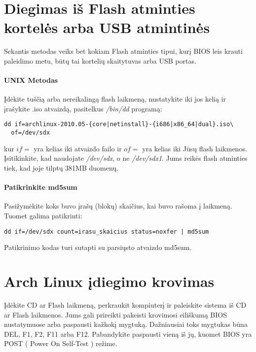   \section{Diegimas iš Flash atminties kortelės arba USB atmintinės}

  Sekantis metodas veiks bet kokiam Flash atminties tipui, kurį BIOS
  leis krauti paleidimo metu, būtų tai kortelių skaitytuvas arba USB
  portas.

  \paragraph{UNIX Metodas}
  
  Įdėkite tuščią arba nereikalingą flash laikmeną, nustatykite iki jos
  kelią ir įrašykite .iso atvaizdą, pasitelkus \textsl{/bin/dd}
  programą:

  \begin{verbatim}
dd if=archlinux-2010.05-{core|netinstall}-{i686|x86_64|dual}.iso\
  of=/dev/sdx
  \end{verbatim}

  kur $if=$ yra kelias iki atvaizdo failo ir $of=$ yra kelias iki Jūsų
  flash laikmenos. Įsitikinkite, kad naudojate \textsl{/dev/sdx}, o ne
  \textsl{/dev/sdx1}. Jums reikės flash atminties tiek, kad joje
  tilptų 381MB duomenų.

  \paragraph{Patikrinkite md5sum}

  Pasižymėkite koks buvo įrašų (blokų) skaičius, kai buvo rašoma į
  laikmeną. Tuomet galima patikrinti:

  \begin{verbatim}
dd if=/dev/sdx count=irasu_skaicius status=noxfer | md5sum
  \end{verbatim}

  Patikrinimo kodas turi sutapti su parsiųsto atvaizdo md5sum.


  \section{Arch Linux įdiegimo krovimas}
  
  Įdėkite CD ar Flash laikmeną, perkraukit kompiuterį ir paleiskite
  sistema iš CD ar Flash laikmenos. Jums gali prireikti pakeisti
  krovimosi eiliškumą BIOS nustatymuose arba paspausti kažkokį
  mygtuką. Dažniausiai toks mygtukas būna DEL, F1, F2, F11 arba
  F12. Pabandykite paspausti vieną iš jų, kuomet BIOS yra POST ( Power
  On Self-Test ) režime.

